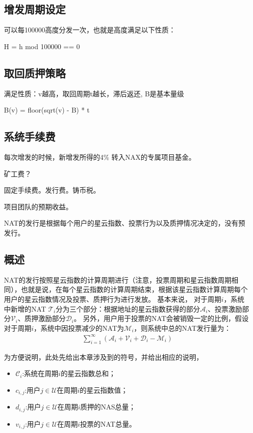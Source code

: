 \subsection{增发周期设定}
可以每100000高度分发一次，也就是高度满足以下性质：

H = h mod 100000 == 0

\subsection{取回质押策略}
满足性质：v越高，取回周期t越长，滞后返还, B是基本量级

B(v) =  floor(sqrt(v) - B) * t

\subsection{系统手续费}
每次增发的时候，新增发所得的4\% 转入NAX的专属项目基金。

矿工费？

固定手续费。发行费。铸币税。

项目团队的预期收益。



NAT的发行是根据每个用户的星云指数、投票行为以及质押情况决定的，没有预发行。

\subsection{概述}
NAT的发行按照星云指数的计算周期进行（注意，投票周期和星云指数周期相同），也就是说，在每个星云指数的计算周期结束，根据该星云指数计算周期每个用户的星云指数情况及投票、质押行为进行发放。
基本来说，
对于周期$i$，系统中新增的NAT $\mathcal{T}_i$分为三个部分：根据地址的星云指数获得的部分$\mathcal{A}_i$、投票激励部分$\mathcal{V}_i$、质押激励部分$\mathcal{D}_i$。
另外，用户用于投票的NAT会被销毁一定的比例，假设对于周期$i$，系统中因投票减少的NAT为$\mathcal{M}_i$，则系统中总的NAT发行量为：
\begin{align}
\sum_{i=1}^{\infty} (\mathcal{A}_i + \mathcal{V}_i + \mathcal{D}_i - \mathcal{M}_i)
\end{align}

为方便说明，此处先给出本章涉及到的符号，并给出相应的说明，
\begin{itemize}
\item $\mathcal{C}_i$:系统在周期$i$的星云指数总和；
\item $c_{i,j}$:用户$j \in \mathcal{U}$在周期$i$的星云指数值；
\item $d_{i,j}$:用户$j \in \mathcal{U}$在周期$i$质押的NAS总量；
\item $v_{i,j}$:用户$j \in \mathcal{U}$在周期$i$投票的NAT总量。
\end{itemize}

